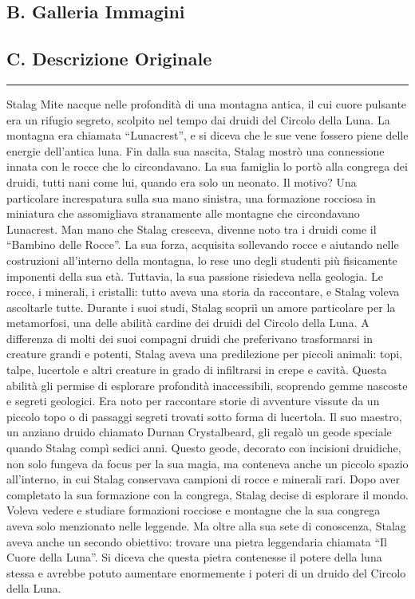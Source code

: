 \subsection{B. Galleria Immagini}\label{b.-galleria-immagini}

\subsection{C. Descrizione Originale}\label{c.-descrizione-originale}

\begin{center}\rule{0.5\linewidth}{0.5pt}\end{center}

Stalag Mite nacque nelle profondità di una montagna antica, il cui cuore
pulsante era un rifugio segreto, scolpito nel tempo dai druidi del
Circolo della Luna. La montagna era chiamata ``Lunacrest'', e si diceva
che le sue vene fossero piene delle energie dell'antica luna. Fin dalla
sua nascita, Stalag mostrò una connessione innata con le rocce che lo
circondavano. La sua famiglia lo portò alla congrega dei druidi, tutti
nani come lui, quando era solo un neonato. Il motivo? Una particolare
increspatura sulla sua mano sinistra, una formazione rocciosa in
miniatura che assomigliava stranamente alle montagne che circondavano
Lunacrest. Man mano che Stalag cresceva, divenne noto tra i druidi come
il ``Bambino delle Rocce''. La sua forza, acquisita sollevando rocce e
aiutando nelle costruzioni all'interno della montagna, lo rese uno degli
studenti più fisicamente imponenti della sua età. Tuttavia, la sua
passione risiedeva nella geologia. Le rocce, i minerali, i cristalli:
tutto aveva una storia da raccontare, e Stalag voleva ascoltarle tutte.
Durante i suoi studi, Stalag scopriì un amore particolare per la
metamorfosi, una delle abilità cardine dei druidi del Circolo della
Luna. A differenza di molti dei suoi compagni druidi che preferivano
trasformarsi in creature grandi e potenti, Stalag aveva una predilezione
per piccoli animali: topi, talpe, lucertole e altri creature in grado di
infiltrarsi in crepe e cavità. Questa abilità gli permise di esplorare
profondità inaccessibili, scoprendo gemme nascoste e segreti geologici.
Era noto per raccontare storie di avventure vissute da un piccolo topo o
di passaggi segreti trovati sotto forma di lucertola. Il suo maestro, un
anziano druido chiamato Durnan Crystalbeard, gli regalò un geode
speciale quando Stalag compì sedici anni. Questo geode, decorato con
incisioni druidiche, non solo fungeva da focus per la sua magia, ma
conteneva anche un piccolo spazio all'interno, in cui Stalag conservava
campioni di rocce e minerali rari. Dopo aver completato la sua
formazione con la congrega, Stalag decise di esplorare il mondo. Voleva
vedere e studiare formazioni rocciose e montagne che la sua congrega
aveva solo menzionato nelle leggende. Ma oltre alla sua sete di
conoscenza, Stalag aveva anche un secondo obiettivo: trovare una pietra
leggendaria chiamata ``Il Cuore della Luna''. Si diceva che questa
pietra contenesse il potere della luna stessa e avrebbe potuto aumentare
enormemente i poteri di un druido del Circolo della Luna.

